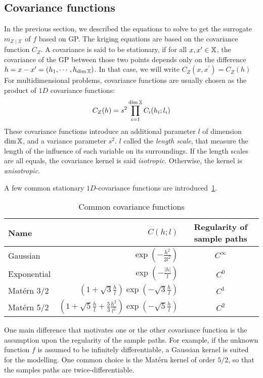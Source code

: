 \documentclass[../../Main_ManuscritThese.tex]{subfiles}
\begin{document}
\subsection{Covariance functions}
\label{sec:cov_fun}
In the previous section, we described the equations to solve to get the surrogate $m_{Z\mid \mathcal{X}}$ of $f$ based on GP.
The kriging equations are based on the covariance function $C_Z$.
A covariance is said to be stationary, if for all $x, x^{\prime} \in \mathbb{X}$, the covariance of the GP between those two points depends only on the  difference $h = x-x^{\prime}=(h_1,\cdots, h_{\dim\mathbb{X}})$. In that case, we will write $C_Z(x, x^{\prime}) = C_Z(h)$ 
For multidimensional problems, covariance functions are usually chosen as the product of $1D$ covariance functions:
\begin{equation}
  C_Z(h) = s^2\prod_{i=1}^{\dim \mathbb{X}} C_i(h_i;l_i)
\end{equation}
These covariance functions introduce an additional parameter $l$ of dimension $\dim \mathbb{X}$, and a variance parameter $s^2$.
$l$ called the \emph{length scale}, that measure the length of the influence of each variable on its surroundings. If the length scales are all equals, the covariance kernel is said \emph{isotropic}. Otherwise, the kernel is \emph{anisotropic}.

A few common stationary $1D$-covariance functions are introduced~\cref{tab:common_cov_fc}.

  \begin{table}[ht]
    \centering
    \begin{tabular}{lrc}
      \toprule
      Name & $C(h;l)$ & Regularity of sample paths\\ \midrule
      Gaussian & $\exp\left(- \frac{h^2}{2 l^2}\right)$ & $C^{\infty}$\\
      Exponential &$\exp\left(- \frac{\lvert h \rvert}{l}\right)$ & $C^0$  \\
      Matérn 3/2 & $\left(1 + \sqrt{3}\frac{h}{l}\right)\exp\left(-\sqrt{3}\frac{h}{l}\right)$ & $C^1$\\
      Matérn 5/2 & $\left(1+ \sqrt{5}\frac{h}{l} + \frac{5}{3}\frac{h^2}{l^2}\right) \exp\left(-\sqrt{5}\frac{h}{l}\right)$ & $C^2$\\ \bottomrule
    \end{tabular}
    \caption{\label{tab:common_cov_fc} Common covariance functions}
  \end{table}



  One main difference that motivates one or the other covariance function is the assumption upon the regularity of the sample paths. For example, if the unknown function $f$ is assumed to be infinitely differentiable, a Gaussian kernel is suited for the modelling. One common choice is the Matérn kernel of order $5/2$, so that the samples paths are twice-differentiable.
\end{document}
